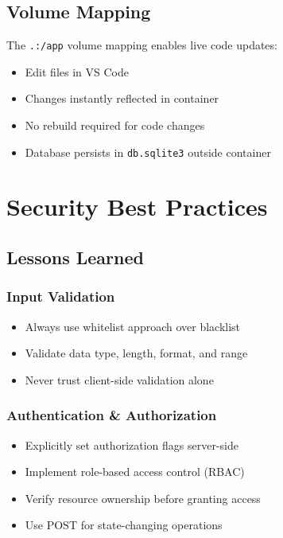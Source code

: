 \documentclass[12pt,a4paper]{article}
\begin{document}
\subsection{Volume Mapping}

The \texttt{.:/app} volume mapping enables live code updates:
\begin{itemize}[leftmargin=*]
    \item Edit files in VS Code
    \item Changes instantly reflected in container
    \item No rebuild required for code changes
    \item Database persists in \texttt{db.sqlite3} outside container
\end{itemize}

\newpage

\section{Security Best Practices}

\subsection{Lessons Learned}

\subsubsection{Input Validation}
\begin{itemize}[leftmargin=*]
    \item Always use whitelist approach over blacklist
    \item Validate data type, length, format, and range
    \item Never trust client-side validation alone
\end{itemize}

\subsubsection{Authentication \& Authorization}
\begin{itemize}[leftmargin=*]
    \item Explicitly set authorization flags server-side
    \item Implement role-based access control (RBAC)
    \item Verify resource ownership before granting access
    \item Use POST for state-changing operations
\end{itemize}
\end{document}

